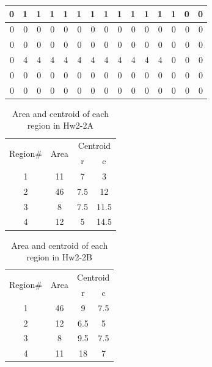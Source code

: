 \documentclass[a4paper]{article}
\begin{document}
\begin{table}[h]
\begin{tabular}{|r|r|r|r|r|r|r|r|r|r|r|r|r|r|r|}
		\hline
		0     & 1     & 1     & 1     & 1     & 1     & 1     & 1     & 1     & 1     & 1     & 1     & 1     & 0     & 0 \bigstrut\\
		\hline
		0     & 0     & 0     & 0     & 0     & 0     & 0     & 0     & 0     & 0     & 0     & 0     & 0     & 0     & 0 \bigstrut\\
		\hline
		0     & 0     & 0     & 0     & 0     & 0     & 0     & 0     & 0     & 0     & 0     & 0     & 0     & 0     & 0 \bigstrut\\
		\hline
		0     & 4     & 4     & 4     & 4     & 4     & 4     & 4     & 4     & 4     & 4     & 4     & 0     & 0     & 0 \bigstrut\\
		\hline
		0     & 0     & 0     & 0     & 0     & 0     & 0     & 0     & 0     & 0     & 0     & 0     & 0     & 0     & 0 \bigstrut\\
		\hline
		0     & 0     & 0     & 0     & 0     & 0     & 0     & 0     & 0     & 0     & 0     & 0     & 0     & 0     & 0 \bigstrut\\
		\hline
	\end{tabular}%
	\label{table: Hw2-2B connected}%
\end{table}%

\begin{table}[h]
	\centering
	\caption{Area and centroid of each region in Hw2-2A}
	\begin{tabular}{|c|c|c|c|}
		\hline
		\multirow{2}[4]{*}{Region\#} & \multirow{2}[4]{*}{Area} & \multicolumn{2}{c|}{Centroid} \bigstrut\\
		\cline{3-4}          &       & r     & c \bigstrut\\
		\hline
		1     & 11    & 7     & 3 \bigstrut\\
		\hline
		2     & 46    & 7.5   & 12 \bigstrut\\
		\hline
		3     & 8     & 7.5   & 11.5 \bigstrut\\
		\hline
		4     & 12    & 5     & 14.5 \bigstrut\\
		\hline
	\end{tabular}%
	\label{table: Hw2-2A centroid}%
\end{table}%

\begin{table}[h]
	\centering
	\caption{Area and centroid of each region in Hw2-2B}
	\begin{tabular}{|c|c|c|c|}
		\hline
		\multirow{2}[4]{*}{Region\#} & \multirow{2}[4]{*}{Area} & \multicolumn{2}{c|}{Centroid} \bigstrut\\
		\cline{3-4}          &       & r     & c \bigstrut\\
			\hline
			1     & 46    & 9     & 7.5 \bigstrut\\
			\hline
			2     & 12    & 6.5   & 5 \bigstrut\\
			\hline
			3     & 8     & 9.5   & 7.5 \bigstrut\\
			\hline
			4     & 11    & 18    & 7 \bigstrut\\
			\hline
	\end{tabular}%
	\label{table: Hw2-2B centroid}%
\end{table}%
\end{document}
